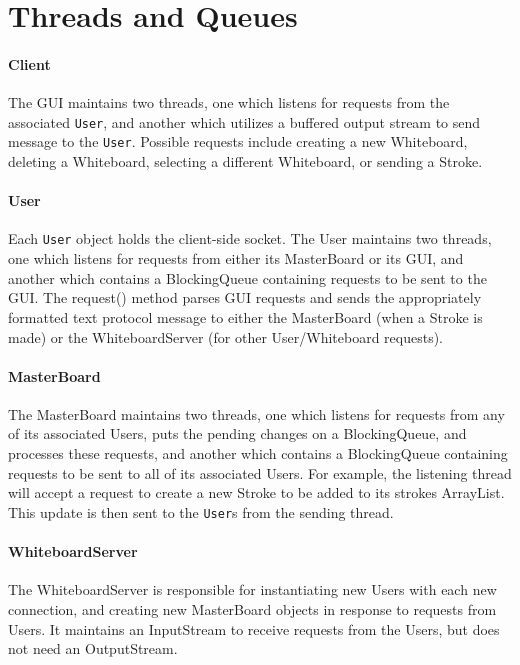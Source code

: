 \section{Threads and Queues}

\paragraph{Client} The GUI maintains two threads, one which listens for requests from the associated \texttt{User}, and another which utilizes a buffered output stream to send message to the \texttt{User}. Possible requests include creating a new Whiteboard, deleting a Whiteboard, selecting a different Whiteboard, or sending a Stroke.

\paragraph{User} Each \texttt{User} object holds the client-side socket. The User maintains two threads, one which listens for requests from either its MasterBoard or its GUI, and another which contains a BlockingQueue containing requests to be sent to the GUI. The request() method parses GUI requests and sends the appropriately formatted text protocol message to either the MasterBoard (when a Stroke is made) or the WhiteboardServer (for other User/Whiteboard requests).

\paragraph{MasterBoard} The MasterBoard maintains two threads, one which listens for requests from any of its associated Users, puts the pending changes on a BlockingQueue, and processes these requests, and another which contains a BlockingQueue containing requests to be sent to all of its associated Users. For example, the listening thread will accept a request to create a new Stroke to be added to its strokes ArrayList. This update is then sent to the \texttt{User}s from the sending thread.

\paragraph{WhiteboardServer} The WhiteboardServer is responsible for instantiating new Users with each new connection, and creating new MasterBoard objects in response to requests from Users. It maintains an InputStream to receive requests from the Users, but does not need an OutputStream.

